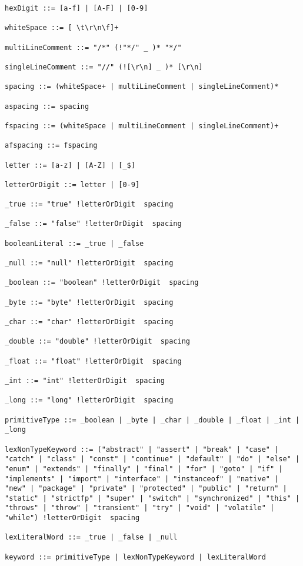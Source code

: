 \begin{lstlisting}[breaklines=true]
hexDigit ::= [a-f] | [A-F] | [0-9]

whiteSpace ::= [ \t\r\n\f]+

multiLineComment ::= "/*" (!"*/" _ )* "*/"

singleLineComment ::= "//" (![\r\n] _ )* [\r\n]

spacing ::= (whiteSpace+ | multiLineComment | singleLineComment)*

aspacing ::= spacing

fspacing ::= (whiteSpace | multiLineComment | singleLineComment)+

afspacing ::= fspacing

letter ::= [a-z] | [A-Z] | [_$]

letterOrDigit ::= letter | [0-9]

_true ::= "true" !letterOrDigit  spacing

_false ::= "false" !letterOrDigit  spacing

booleanLiteral ::= _true | _false

_null ::= "null" !letterOrDigit  spacing

_boolean ::= "boolean" !letterOrDigit  spacing

_byte ::= "byte" !letterOrDigit  spacing

_char ::= "char" !letterOrDigit  spacing

_double ::= "double" !letterOrDigit  spacing

_float ::= "float" !letterOrDigit  spacing

_int ::= "int" !letterOrDigit  spacing

_long ::= "long" !letterOrDigit  spacing

primitiveType ::= _boolean | _byte | _char | _double | _float | _int | _long

lexNonTypeKeyword ::= ("abstract" | "assert" | "break" | "case" | "catch" | "class" | "const" | "continue" | "default" | "do" | "else" | "enum" | "extends" | "finally" | "final" | "for" | "goto" | "if" | "implements" | "import" | "interface" | "instanceof" | "native" | "new" | "package" | "private" | "protected" | "public" | "return" | "static" | "strictfp" | "super" | "switch" | "synchronized" | "this" | "throws" | "throw" | "transient" | "try" | "void" | "volatile" | "while") !letterOrDigit  spacing

lexLiteralWord ::= _true | _false | _null

keyword ::= primitiveType | lexNonTypeKeyword | lexLiteralWord


\end{lstlisting}
